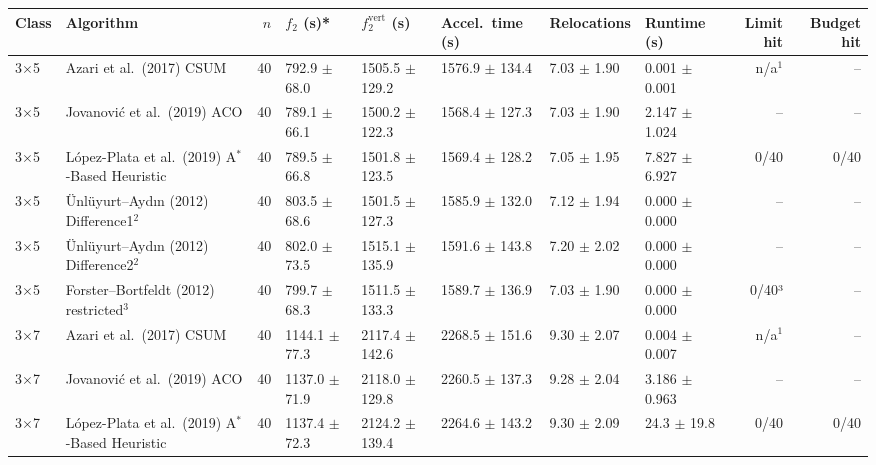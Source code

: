 
\begin{table}[htbp]
\centering
\small
\begin{tabular}{llrlllllrr}
\toprule
Class & Algorithm & $n$ & $f_2$ (s)* & $f_2^{\mathrm{vert}}$ (s) & Accel.\ time (s) & Relocations & Runtime (s) & Limit hit & Budget hit \\
\midrule
3$\times$5 & Azari et al.\ (2017) CSUM & 40 & 792.9 $\pm$ 68.0 & 1505.5 $\pm$ 129.2 & 1576.9 $\pm$ 134.4 & 7.03 $\pm$ 1.90 & 0.001 $\pm$ 0.001 & n/a$^{1}$ & -- \\
3$\times$5 & Jovanovi\'{c} et al.\ (2019) ACO & 40 & 789.1 $\pm$ 66.1 & 1500.2 $\pm$ 122.3 & 1568.4 $\pm$ 127.3 & 7.03 $\pm$ 1.90 & 2.147 $\pm$ 1.024 & -- & -- \\
3$\times$5 & L\'{o}pez-Plata et al.\ (2019) A$^\ast$-Based Heuristic & 40 & 789.5 $\pm$ 66.8 & 1501.8 $\pm$ 123.5 & 1569.4 $\pm$ 128.2 & 7.05 $\pm$ 1.95 & 7.827 $\pm$ 6.927 & 0/40 & 0/40 \\
3$\times$5 & \"{U}nl\"{u}yurt--Ayd\i{}n (2012) Difference1$^{2}$ & 40 & 803.5 $\pm$ 68.6 & 1501.5 $\pm$ 127.3 & 1585.9 $\pm$ 132.0 & 7.12 $\pm$ 1.94 & 0.000 $\pm$ 0.000 & -- & -- \\
3$\times$5 & \"{U}nl\"{u}yurt--Ayd\i{}n (2012) Difference2$^{2}$ & 40 & 802.0 $\pm$ 73.5 & 1515.1 $\pm$ 135.9 & 1591.6 $\pm$ 143.8 & 7.20 $\pm$ 2.02 & 0.000 $\pm$ 0.000 & -- & -- \\
3$\times$5 & Forster--Bortfeldt (2012) restricted$^{3}$ & 40 & 799.7 $\pm$ 68.3 & 1511.5 $\pm$ 133.3 & 1589.7 $\pm$ 136.9 & 7.03 $\pm$ 1.90 & 0.000 $\pm$ 0.000 & 0/40³ & -- \\
\midrule
3$\times$7 & Azari et al.\ (2017) CSUM & 40 & 1144.1 $\pm$ 77.3 & 2117.4 $\pm$ 142.6 & 2268.5 $\pm$ 151.6 & 9.30 $\pm$ 2.07 & 0.004 $\pm$ 0.007 & n/a$^{1}$ & -- \\
3$\times$7 & Jovanovi\'{c} et al.\ (2019) ACO & 40 & 1137.0 $\pm$ 71.9 & 2118.0 $\pm$ 129.8 & 2260.5 $\pm$ 137.3 & 9.28 $\pm$ 2.04 & 3.186 $\pm$ 0.963 & -- & -- \\
3$\times$7 & L\'{o}pez-Plata et al.\ (2019) A$^\ast$-Based Heuristic & 40 & 1137.4 $\pm$ 72.3 & 2124.2 $\pm$ 139.4 & 2264.6 $\pm$ 143.2 & 9.30 $\pm$ 2.09 & 24.3 $\pm$ 19.8 & 0/40 & 0/40 \\

\end{tabular}
\end{table}
